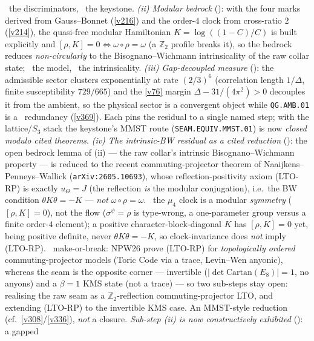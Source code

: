 \documentclass[11pt,a4paper]{article}
\newcommand{\Z}{\mathbb Z}
\begin{document}
\begin{keybox}
\mE\ the discriminators, \mO\ the keystone. \emph{(ii) Modular bedrock} (): with the
four marks derived from Gauss--Bonnet (\vref{v216}) and the order-$4$ clock from cross-ratio $2$ (\vref{v214}), the
quasi-free modular Hamiltonian $K=\log((1{-}C)/C)$ is built explicitly and $[\rho,K]{=}0\Leftrightarrow
\omega{\circ}\rho{=}\omega$ (a $\Z_2$ profile breaks it), so the bedrock reduces \emph{non-circularly} to the
Bisognano--Wichmann intrinsicality of the raw collar state; \mE\ the model, \mO\ the intrinsicality.
\emph{(iii) Gap-decoupled measure} (): the admissible sector clusters
exponentially at rate $(2/3)^6$ (correlation length $1/\Delta$, finite susceptibility $729/665$) and the \vref{v76}
margin $\Delta-31/(4\pi^2)>0$ decouples it from the ambient, so the physical sector is a convergent object
while \texttt{QG.AMB.01} is a \mC\ redundancy (\vref{v369}). Each pins the residual to a single named step; with the
lattice/$S_3$ stack the keystone's MMST route (\texttt{SEAM.EQUIV.MMST.01}) is now \emph{closed modulo cited
theorems}.
\emph{(iv) The intrinsic-BW residual as a cited reduction} (): the open
bedrock lemma of (ii) --- the raw collar's intrinsic Bisognano--Wichmann property --- is reduced to the recent
commuting-projector theorem of Naaijkens--Penneys--Wallick (\texttt{arXiv:2605.10693}), whose reflection-positivity
axiom (LTO-RP) is exactly $u_\Theta{=}J$ (the reflection \emph{is} the modular conjugation), i.e.\ the BW condition
$\theta K\theta{=}-K$ --- \emph{not} $\omega{\circ}\rho{=}\omega$. \mE\ the $\mu_4$ clock is a modular \emph{symmetry}
($[\rho,K]{=}0$), not the flow ($\sigma^\psi{=}\rho$ is type-wrong, a one-parameter group versus a finite order-$4$
element); a positive character-block-diagonal $K$ has $[\rho,K]{=}0$ yet, being positive definite, never
$\theta K\theta{=}-K$, so clock-invariance does \emph{not} imply (LTO-RP). \mO\ make-or-break: NPW26 prove (LTO-RP)
for \emph{topologically ordered} commuting-projector models (Toric Code via a trace, Levin--Wen anyonic), whereas the
seam is the opposite corner --- invertible ($|\det\mathrm{Cartan}(E_8)|{=}1$, no anyons) and a $\beta{=}1$ KMS state
(not a trace) --- so two sub-steps stay open: realising the raw seam as a $\Z_2$-reflection commuting-projector LTO,
and extending (LTO-RP) to the invertible KMS case. An MMST-style reduction (cf.\ \vref{v308}/\vref{v336}), \emph{not}
a closure. \emph{Sub-step (ii) is now constructively exhibited} (): a gapped

\end{keybox}
\end{document}

